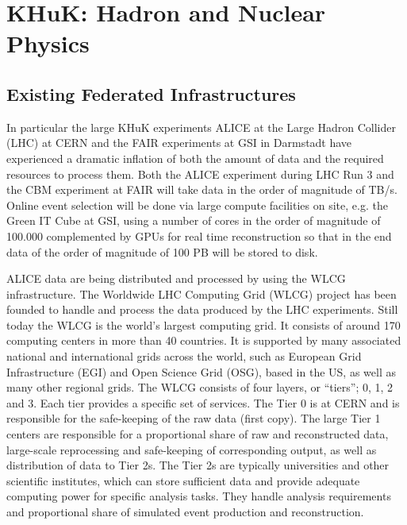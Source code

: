 \section{KHuK: Hadron and Nuclear Physics}


\subsection{Existing Federated Infrastructures}
In particular the large KHuK experiments ALICE at the Large Hadron Collider (LHC) at CERN
and the FAIR experiments at GSI in Darmstadt have experienced a dramatic inflation of both the amount of
data and the required resources to process them. 
Both the ALICE experiment during LHC Run 3 and the CBM experiment at FAIR will take data in the order of magnitude of TB/s.
Online event selection will be done via large compute facilities on site, e.g. the Green IT Cube at GSI,
using a number of cores in the order of magnitude of 100.000 complemented by GPUs for real time reconstruction
so that in the end data of the order of magnitude of 100 PB will be stored to disk.

ALICE data are being distributed and processed by using the WLCG infrastructure. 
The Worldwide LHC Computing Grid (WLCG) project has
been founded to handle and process the data produced by the LHC
experiments. Still today  the WLCG is the world's largest computing
grid. It consists of around 170 computing centers in more than 40
countries.  It is supported by many associated national and
international grids across the world, such as European Grid
Infrastructure (EGI) and Open Science Grid (OSG), based in the US, as well as many other
regional grids.  The WLCG consists of four layers, or ``tiers''; 0, 1, 2
and 3. Each tier provides a specific set of services. The Tier 0 is at
CERN and is responsible for the safe-keeping of the raw data (first
copy). The large Tier 1 centers are responsible for a proportional
share of raw and reconstructed data, large-scale reprocessing and
safe-keeping of corresponding output, as well as distribution of data to Tier
2s. The Tier 2s are typically universities and other scientific
institutes, which can store sufficient data and provide adequate
computing power for specific analysis tasks. They handle analysis
requirements and proportional share of simulated event production and
reconstruction.



